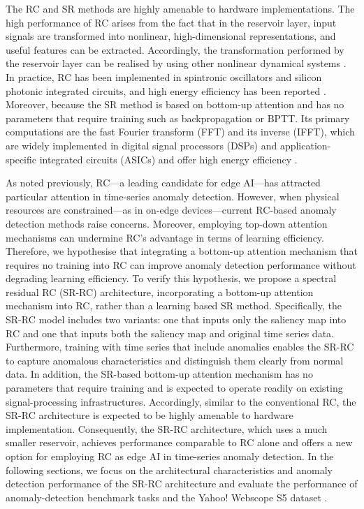 \documentclass[pdflatex,sn-nature]{sn-jnl}
\theoremstyle{thmstyleone}%
\theoremstyle{thmstyletwo}%
\theoremstyle{thmstylethree}%
\begin{document}
The RC and SR methods are highly amenable to hardware implementations.
The high performance of RC arises from the fact that in the reservoir layer, input signals are transformed into nonlinear, high-dimensional representations, and useful features can be extracted.
Accordingly, the transformation performed by the reservoir layer can be realised by using other nonlinear dynamical systems \cite{tanaka2019recent,nakajima2020physical,stepney2024physical}.
In practice, RC has been implemented in spintronic oscillators and silicon photonic integrated circuits, and high energy efficiency has been reported \cite{tanaka2019recent,nakajima2020physical,marrows2024neuromorphic,van2017advances}.
Moreover, because the SR method is based on bottom-up attention and has no parameters that require training such as  backpropagation or BPTT.
Its primary computations are the fast Fourier transform (FFT) and its inverse (IFFT), which are widely implemented in digital signal processors (DSPs) and application-specific integrated circuits (ASICs) and offer high energy efficiency \cite{garrido2022survey,garrido2020evolution,noor2018design}.

As noted previously, RC—a leading candidate for edge AI—has attracted particular attention in time-series anomaly detection. 
However, when physical resources are constrained—as in on-edge devices—current RC-based anomaly detection methods raise concerns.
Moreover, employing top-down attention mechanisms can undermine RC’s advantage in terms of learning efficiency.
Therefore, we hypothesise that integrating a bottom-up attention mechanism that requires no training into RC can improve anomaly detection performance without degrading learning efficiency.
To verify this hypothesis, we propose a spectral residual RC (SR-RC) architecture, incorporating a bottom-up attention mechanism into RC, rather than a learning based SR method. 
Specifically, the SR-RC model includes two variants: one that inputs only the saliency map into RC and one that inputs both the saliency map and original time series data.
Furthermore, training with time series that include anomalies enables the SR-RC to capture anomalous characteristics and distinguish them clearly from normal data.
In addition, the SR-based bottom-up attention mechanism has no parameters that require training and is expected to operate readily on existing signal-processing infrastructures.
Accordingly, similar to the conventional RC, the SR-RC architecture is expected to be highly amenable to hardware implementation.
Consequently, the SR-RC architecture, which uses a much smaller reservoir, achieves performance comparable to RC alone and offers a new option for employing RC as edge AI in time-series anomaly detection.
In the following sections, we focus on the architectural characteristics and anomaly detection performance of the SR-RC architecture and evaluate the performance of anomaly-detection benchmark tasks \cite{Lai2021RevisitingTS} and the Yahoo! Webscope S5 dataset \cite{laptev2015yahoo}.
\end{document}
